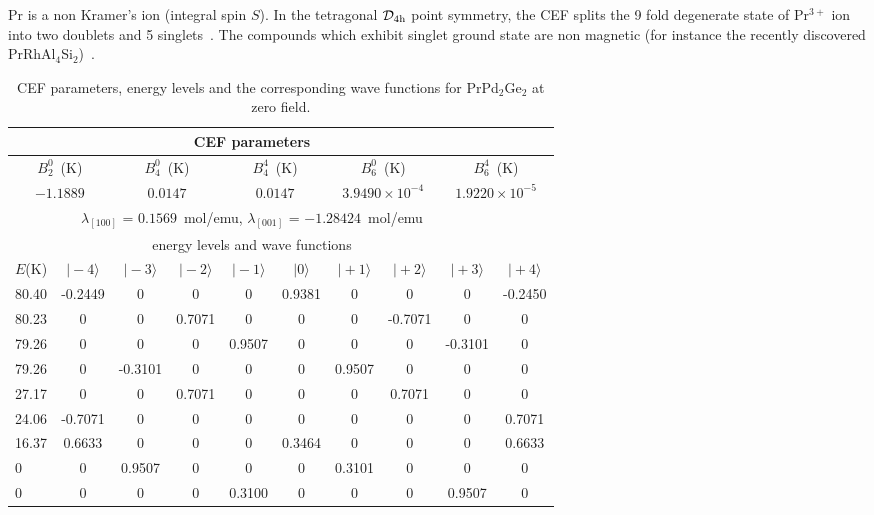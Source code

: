 \documentclass[preprint,showpacs,preprintnumbers,amsmath,amssymb, prb]{revtex4}
\begin{document}
 Pr is a non Kramer's ion (integral spin $S$). In the tetragonal $\mathcal{D}_{\rm 4h}$ point symmetry, the CEF splits the 9 fold degenerate state of Pr$^{3+}$ ion into two doublets and 5 singlets~\cite{Runciman}. The compounds which exhibit singlet ground state are non magnetic (for instance the recently discovered PrRhAl$_4$Si$_2$)~\cite{PrRhAl4Si2}.
%
\begin{table*}[!]
\begin{center}
\caption{\label{table_CEF_Pr} CEF parameters, energy levels
and the corresponding wave functions for PrPd$_2$Ge$_2$ at zero field.}
\begin{tabular}{lccccccccc}\hline
\multicolumn{9}{c}{CEF parameters} \\ \hline
\multicolumn{2}{c}{$B_{2}^{0}$~(K)} & \multicolumn{2}{c}{$B_{4}^{0}$~(K)} & \multicolumn{2}{c}{$B_{4}^{4}$~(K)} & \multicolumn{2}{c}{$B_{6}^{0}$~(K)} & \multicolumn{2}{c}{$B_{6}^{4}$~(K)} \\
\multicolumn{2}{c}{$-1.1889$} & \multicolumn{2}{c}{$0.0147$} & \multicolumn{2}{c}{$0.0147$}	& \multicolumn{2}{c}{$3.9490\times10^{-4}$} & \multicolumn{2}{c}{$1.9220\times10^{-5}$} \\
\multicolumn{9}{c}{$\lambda_{[100]}$ = $0.1569$~mol/emu, 	$\lambda_{[001]}$ = $-1.28424 $~mol/emu} \\ \hline
\multicolumn{9}{c}{energy levels and wave functions}\\ \hline
$E$(K) & $\mid-4\rangle$ & $\mid-3\rangle$ & $\mid-2\rangle$ & $\mid-1\rangle$ & $\mid0\rangle$ & $\mid+1\rangle$& $\mid+2\rangle$ & $\mid+3\rangle$& $\mid+4\rangle$ \\
80.40	&	-0.2449	&	0	&	0	&	0	&	0.9381	&	0	&	0	&	0	&	-0.2450\\
80.23	&	0	&	0	&	0.7071	&	0	&	0	&	0	&	-0.7071	&	0	&	0\\
79.26	&	0	&	0	&	0	&	0.9507	&	0	&	0	&	0	&	-0.3101	&	0\\
79.26	&	0	&	-0.3101	&	0	&	0	&	0	&	0.9507	&	0	&	0	&	0 \\
27.17	&	0	&	0	&	0.7071	&	0	&	0	&	0	&	0.7071	&	0	&	0 \\
24.06	&	-0.7071	&	0	&	0	&	0	&	0	&	0	&	0	&	0	&	0.7071\\
16.37	&	0.6633	&	0	&	0	&	0	&	0.3464	&	0	&	0	&	0	&	0.6633\\
0	&	0	&	0.9507	&	0	&	0	&	0	&	0.3101	&	0	&	0	&	0\\
0	&	0	&	0	&	0	&	0.3100	&	0	&	0	&	0	&	0.9507	&	0 \\
\hline
\end{tabular}
\end{center}
\end{table*}
\end{document}
